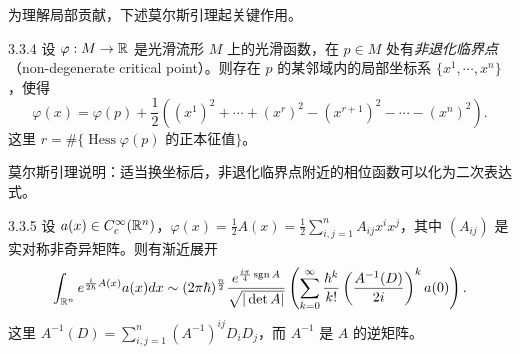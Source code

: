 为理解局部贡献，下述莫尔斯引理起关键作用。

\begin{theorem}{3.3.4}
设 $\varphi:M\to\mathbb{R}$ 是光滑流形 $M$ 上的光滑函数，在 $p\in M$ 处有\emph{非退化临界点}（non-degenerate critical point）。则存在 $p$ 的某邻域内的局部坐标系 $\{x^1,\cdots,x^n\}$，使得
\[
\varphi(x)=\varphi(p)+\frac12\left((x^1)^2+\cdots+(x^r)^2-(x^{r+1})^2-\cdots-(x^n)^2\right).
\]
这里 $r=\#\{\operatorname{Hess}\varphi(p)\text{ 的正本征值}\}$。
\end{theorem}

莫尔斯引理说明：适当换坐标后，非退化临界点附近的相位函数可以化为二次表达式。

\begin{proposition}{3.3.5}
设 $a(x)\in C_c^\infty(\mathbb{R}^n)$，$\varphi(x)=\frac12A(x)=\frac12\sum_{i,j=1}^nA_{ij}x^ix^j$，其中 $(A_{ij})$ 是实对称非奇异矩阵。则有渐近展开
\[
\int_{\mathbb{R}^n}e^{\frac i{2\hbar}A(x)}a(x)dx\sim(2\pi\hbar)^{\frac n2}\frac{e^{\frac{i\pi}{4}\operatorname{sgn} A}}{\sqrt{|\det A|}}\left(\sum_{k=0}^\infty\frac{\hbar^k}{k!}\left(\frac{A^{-1}(D)}{2i}\right)^k a(0)\right).
\]
这里 $A^{-1}(D)=\sum_{i,j=1}^n(A^{-1})^{ij}D_iD_j$，而 $A^{-1}$ 是 $A$ 的逆矩阵。
\end{proposition}

